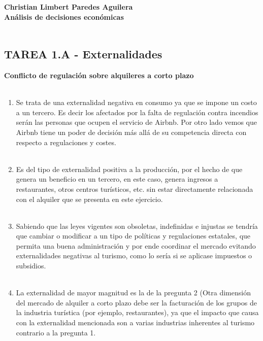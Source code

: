 \textbf{\bfseries Christian Limbert Paredes Aguilera}\\
\textbf{Análisis de decisiones económicas}\\\\
\subsection*{\center TAREA 1.A - Externalidades}
\vspace{1cm}
\textbf{Conflicto de regulación sobre alquileres a corto plazo}\\\\

\begin{enumerate}

    \item Se trata de una externalidad negativa en consumo ya que se impone un costo a un tercero. Es decir los afectados por la falta de regulación contra incendios serán las personas que ocupen el servicio de Airbnb. Por otro lado vemos que Airbnb tiene un poder de decisión más allá de su competencia directa con respecto a regulaciones y costes.\\\\

    \item Es del tipo de externalidad positiva a la producción, por el hecho de que genera un beneficio en un tercero, en este caso, genera ingresos a restaurantes, otros centros turísticos, etc. sin estar directamente relacionada con el alquiler que se presenta en este ejercicio.\\\\


    \item Sabiendo que las leyes vigentes son obsoletas, indefinidas e injustas se tendría que cambiar o modificar a un tipo de políticas y regulaciones estatales, que permita una buena administración y por ende coordinar el mercado evitando  externalidades negativas al turismo, como lo sería si se aplicase impuestos o subsidios.\\\\

    \item La externalidad de mayor magnitud es la de la pregunta 2 (Otra dimensión del mercado de alquiler a corto plazo debe ser la facturación de los grupos de la industria turística (por ejemplo, restaurantes), ya que el impacto que causa con la externalidad mencionada son a varias industrias inherentes al turismo contrario a la pregunta 1.\\\\

\end{enumerate}



